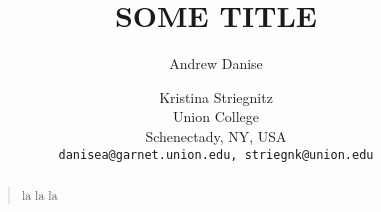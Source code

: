 \documentclass[letterpaper]{article}
\begin{document}
%
\title{SOME TITLE}
\author{
Andrew Danise \and Kristina Striegnitz\\
Union College\\
Schenectady, NY, USA\\
\texttt{danisea@garnet.union.edu, striegnk@union.edu}
}
\maketitle
\begin{abstract}
\begin{quote}
la la la 
\end{quote}
\end{abstract}











\end{document}
